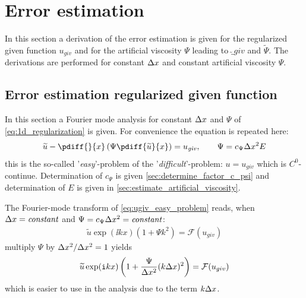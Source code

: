 \chapter{Error estimation}\label{sec:error_estimation}
In this section a derivation of the error estimation is given for the regularized given function $u_{giv}$ and for the artificial viscosity $\Psi$ leading to $\utilde_{giv}$ and $\widetilde{\Psi}$.
The derivations are performed for constant $\Delta x$ and constant artificial viscosity $\Psi$.
\section{Error estimation regularized given function}\label{sec:error_estimation_given_function}
In this section a Fourier mode analysis for constant $\Delta x$ and $\Psi$ of \autoref{eq:1d_regularization} is given.
For convenience the equation is repeated here:
%
\begin{align}
    \widetilde u - \pdiff{}{x} \left( \Psi \pdiff{\widetilde u}{x} \right) = u_{\mathit{giv}},
    \qquad \Psi = c_\Psi \Dx^2 E
    \label{eq:ugiv_easy_problem}
\end{align}
this is the so-called '\textit{easy}'-problem of the '\textit{difficult}'-problem: $u = u_{\mathit{giv}}$ which is $C^0$-continue.
Determination of $c_\Psi$ is given \autoref{sec:determine_factor_c_psi} and determination of $E$  is given in \autoref{sec:estimate_artificial_viscosity}.

The Fourier-mode transform of \autoref{eq:ugiv_easy_problem} reads, when $\Delta x = \mathit{constant}$ and $\Psi = c_{\Psi} \Delta x^2 = \mathit{constant}$:
\begin{align}
\widetilde u \exp(\ii k x) \left( 1 + \Psi k^2 \right) = \mathcal{F}(u_{giv})
\end{align}
multiply $\Psi$ by $\Delta x^2/\Delta x^2 = 1$ yields
\begin{align}
\widetilde u \exp({\mathtt{i}} k x) \left( 1 + \frac{\Psi}{\Delta x^2} (k\Delta x)^2 \right) = \mathcal{F}(u_{giv})
\label{eq:F_regularization}
\end{align}
which is easier to use in the analysis due to the term $k\Delta x$.

